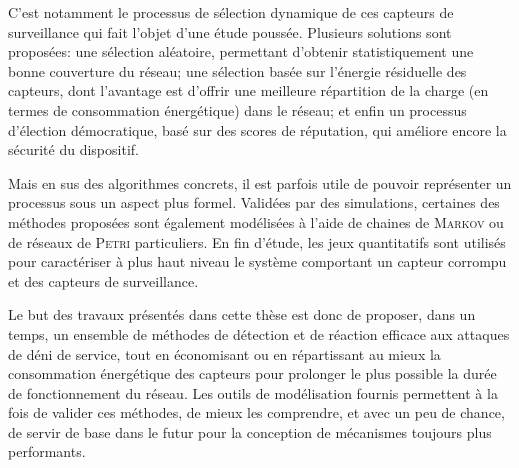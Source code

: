 C'est notamment le processus de sélection dynamique de ces capteurs de surveillance qui fait l'objet d'une étude poussée.
Plusieurs solutions sont proposées: une sélection aléatoire, permettant d'obtenir statistiquement une bonne couverture du réseau; une sélection basée sur l'énergie résiduelle des capteurs, dont l'avantage est d'offrir une meilleure répartition de la charge (en termes de consommation énergétique) dans le réseau; et enfin un processus d'élection démocratique, basé sur des scores de réputation, qui améliore encore la sécurité du dispositif.

Mais en sus des algorithmes concrets, il est parfois utile de pouvoir représenter un processus sous un aspect plus formel.
Validées par des simulations, certaines des méthodes proposées sont également modélisées à l'aide de chaines de \textsc{Markov} ou de réseaux de \textsc{Petri} particuliers.
En fin d'étude, les jeux quantitatifs sont utilisés pour caractériser à plus haut niveau le système comportant un capteur corrompu et des capteurs de surveillance.
\pagebreak %

Le but des travaux présentés dans cette thèse est donc de proposer, dans un temps, un ensemble de méthodes de détection et de réaction efficace aux attaques de déni de service, tout en économisant ou en répartissant au mieux la consommation énergétique des capteurs pour prolonger le plus possible la durée de fonctionnement du réseau.
Les outils de modélisation fournis permettent à la fois de valider ces méthodes, de mieux les comprendre, et avec un peu de chance, de servir de base dans le futur pour la conception de mécanismes toujours plus performants.
